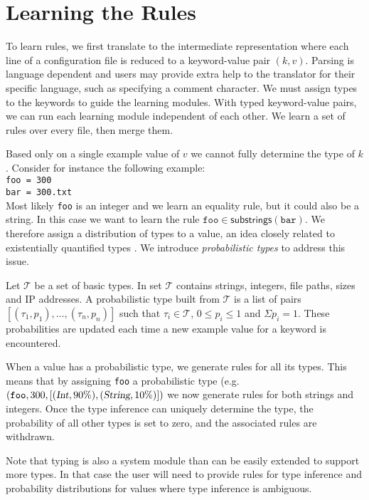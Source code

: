 \section{Learning the Rules}
\label{sec:system}

To learn rules, we first translate to the intermediate representation where each line of a configuration file is reduced to a keyword-value pair $(k,v)$.
Parsing is language dependent and users may provide extra help to the translator for their specific language, such as specifying a comment character.
We must assign types to the keywords to guide the learning modules. 
With typed keyword-value pairs, we can run each learning module independent of each other.
We learn a set of rules over every file, then merge them.

Based only on a single example value of $v$ we cannot fully determine the type of $k$.
Consider for instance the following example:\\
\texttt{\hspace*{2em}foo = 300\\
\hspace*{2em}bar = 300.txt}\\
Most likely \texttt{foo} is an integer and we learn an equality rule, but it could also be a string.
In this case we want to learn the rule $ \texttt{foo} \in \textsf{substrings}(\texttt{bar})$. 
We therefore assign a distribution of types to a value, an idea closely related to existentially quantified types \cite{Launchbury93lazyfunctional}. We introduce {\emph{probabilistic types}} to address this issue.

Let $\mathcal{T}$ be a set of basic types. In \app set $\mathcal{T}$ contains strings, integers, file paths, sizes and IP addresses. 
A probabilistic type built from $\mathcal{T}$ is a list of pairs $[(\tau_1, p_1),\ldots,(\tau_n, p_n)]$ such that $\tau_i \in \mathcal{T}$, 
$0 \le p_i \le 1$ 
and $\Sigma p_i = 1$. These probabilities are updated each time a new example value for a keyword is encountered.

When a value has a probabilistic type, we generate rules for all its types. This means that by assigning {\texttt{foo}} a probabilistic type 
(e.g. $(\texttt{foo}, 300, [(\textsl{Int},90\%),(\textsl{String},10\%)])$
we now generate rules for both strings and integers.
Once the type inference can uniquely determine the type, the probability of all other types is set to zero, and the associated rules are withdrawn.

Note that typing is also a system module than can be easily extended to support more types. 
In that case the user will need to provide rules for type inference and probability distributions for values where type inference is ambiguous.

